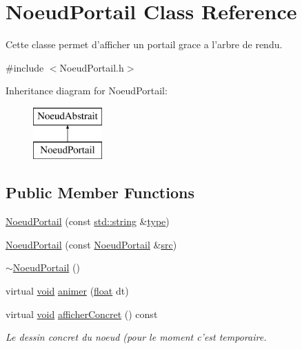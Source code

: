\hypertarget{class_noeud_portail}{\section{Noeud\-Portail Class Reference}
\label{class_noeud_portail}
}


Cette classe permet d'afficher un portail grace a l'arbre de rendu.  




{\ttfamily \#include $<$Noeud\-Portail.\-h$>$}

Inheritance diagram for Noeud\-Portail\-:\begin{figure}[H]
\begin{center}
\leavevmode
\includegraphics[height=2.000000cm]{class_noeud_portail}
\end{center}
\end{figure}
\subsection*{Public Member Functions}
\begin{DoxyCompactItemize}
\item 
\hyperlink{class_noeud_portail_a2b2679b209572bfec9c4fbaba1db7fd6}{Noeud\-Portail} (const \hyperlink{glew_8h_ae84541b4f3d8e1ea24ec0f466a8c568b}{std\-::string} \&\hyperlink{fmod_8h_a5338b9cb3874378d7e5adfbe80a8a381}{type})
\item 
\hyperlink{class_noeud_portail_a9fc4028c467afd1ae588feb679f4ff35}{Noeud\-Portail} (const \hyperlink{class_noeud_portail}{Noeud\-Portail} \&\hyperlink{glew_8h_a72e0fdf0f845ded60b1fada9e9195cd7}{src})
\item 
\hyperlink{class_noeud_portail_a539e125201edd719886ae550eab35a28}{$\sim$\-Noeud\-Portail} ()
\item 
virtual \hyperlink{wglew_8h_aeea6e3dfae3acf232096f57d2d57f084}{void} \hyperlink{class_noeud_portail_ad172adb0152d25d14892049f4f2b10a5}{animer} (\hyperlink{fmod_8h_aeb841aa4b4b5f444b5d739d865b420af}{float} dt)
\item 
virtual \hyperlink{wglew_8h_aeea6e3dfae3acf232096f57d2d57f084}{void} \hyperlink{class_noeud_portail_a282c4e5f63044fbc8db47b7c11f9cd04}{afficher\-Concret} () const 
\begin{DoxyCompactList}\small\item\em Le dessin concret du noeud (pour le moment c'est temporaire. \end{DoxyCompactList}\end{DoxyCompactItemize}
